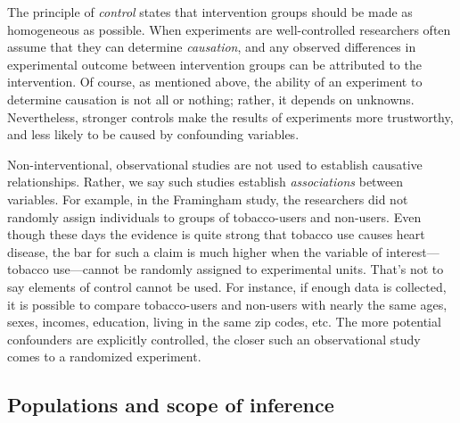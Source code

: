 \documentclass[
]{book}
\theoremstyle{definition}
\theoremstyle{definition}
\theoremstyle{definition}
\theoremstyle{definition}
\theoremstyle{remark}
\begin{document}
The principle of \emph{control} states that intervention groups should be made as homogeneous as possible. When experiments are well-controlled researchers often assume that they can determine \emph{causation}, and any observed differences in experimental outcome between intervention groups can be attributed to the intervention. Of course, as mentioned above, the ability of an experiment to determine causation is not all or nothing; rather, it depends on unknowns. Nevertheless, stronger controls make the results of experiments more trustworthy, and less likely to be caused by confounding variables.

Non-interventional, observational studies are not used to establish causative relationships. Rather, we say such studies establish \emph{associations} between variables. For example, in the Framingham study, the researchers did not randomly assign individuals to groups of tobacco-users and non-users. Even though these days the evidence is quite strong that tobacco use causes heart disease, the bar for such a claim is much higher when the variable of interest---tobacco use---cannot be randomly assigned to experimental units. That's not to say elements of control cannot be used. For instance, if enough data is collected, it is possible to compare tobacco-users and non-users with nearly the same ages, sexes, incomes, education, living in the same zip codes, etc. The more potential confounders are explicitly controlled, the closer such an observational study comes to a randomized experiment.

\hypertarget{populations-and-scope-of-inference}{%
\subsection{Populations and scope of inference}\label{populations-and-scope-of-inference}}
\end{document}
